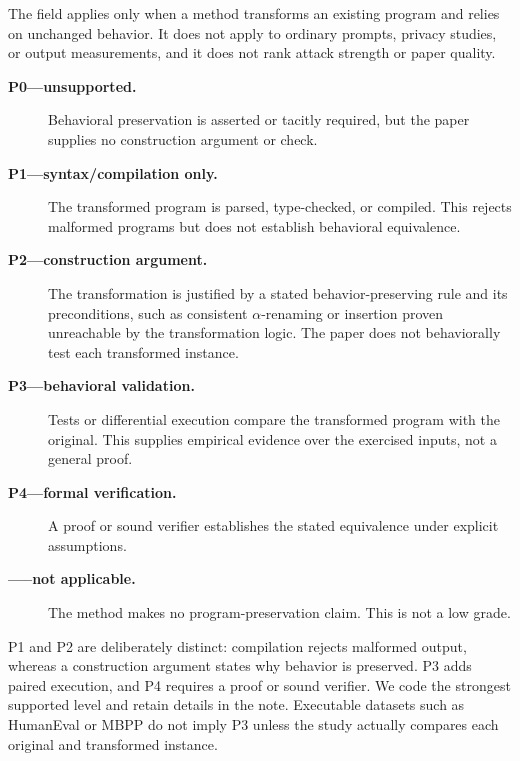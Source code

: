 \documentclass[acmsmall,screen,review]{acmart}
\begin{document}
The field applies only when a method transforms an existing program and relies on unchanged behavior. It does not apply to ordinary prompts, privacy studies, or output measurements, and it does not rank attack strength or paper quality.
\begin{description}
\item[\textbf{P0---unsupported.}] Behavioral preservation is asserted or tacitly required, but the paper supplies no construction argument or check.
\item[\textbf{P1---syntax/compilation only.}] The transformed program is parsed, type-checked, or compiled.  This rejects malformed programs but does not establish behavioral equivalence.
\item[\textbf{P2---construction argument.}] The transformation is justified by a stated behavior-preserving rule and its preconditions, such as consistent $\alpha$-renaming or insertion proven unreachable by the transformation logic. The paper does not behaviorally test each transformed instance.
\item[\textbf{P3---behavioral validation.}] Tests or differential execution compare the transformed program with the original.  This supplies empirical evidence over the exercised inputs, not a general proof.
\item[\textbf{P4---formal verification.}] A proof or sound verifier establishes the stated equivalence under explicit assumptions.
\item[\textbf{-----not applicable.}] The method makes no program-preservation claim.  This is not a low grade.
\end{description}

P1 and P2 are deliberately distinct: compilation rejects malformed output, whereas a construction argument states why behavior is preserved. P3 adds paired execution, and P4 requires a proof or sound verifier. We code the strongest supported level and retain details in the note. Executable datasets such as HumanEval or MBPP do not imply P3 unless the study actually compares each original and transformed instance.
\end{document}
